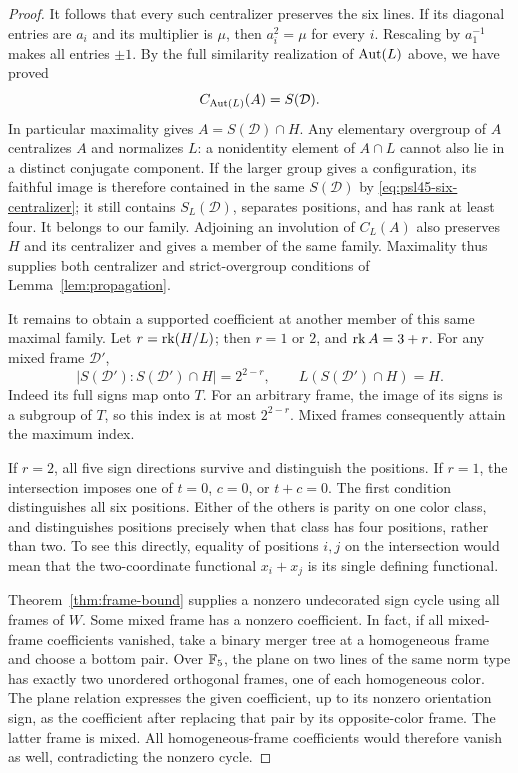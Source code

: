 \begin{proof}
It follows that every such centralizer preserves the six lines.
If its diagonal entries are $a_i$ and its multiplier is $\mu$,
then $a_i^2=\mu$ for every $i$. Rescaling by $a_1^{-1}$ makes
all entries $\pm1$. By the full similarity realization of
$\operatorname{Aut}(L)$ above, we have proved
\begin{equation}\label{eq:psl45-six-centralizer}
 C_{\operatorname{Aut}(L)}(A)=S(\mathcal D).
\end{equation}
In particular maximality gives $A=S(\mathcal D)\cap H$.
Any elementary overgroup of $A$ centralizes $A$ and normalizes $L$:
a nonidentity element of $A\cap L$ cannot also lie in a distinct
conjugate component. If the larger group gives a configuration,
its faithful image is therefore contained in the same
$S(\mathcal D)$ by \eqref{eq:psl45-six-centralizer}; it still
contains $S_L(\mathcal D)$, separates positions, and has rank at
least four. It belongs to our family. Adjoining an involution of
$C_L(A)$ also preserves $H$ and its centralizer and gives a
member of the same family. Maximality thus supplies both
centralizer and strict-overgroup conditions of
Lemma~\ref{lem:propagation}.

It remains to obtain a supported coefficient at another member
of this same maximal family. Let $r=\operatorname{rk}(H/L)$; then $r=1$ or $2$,
and $\operatorname{rk} A=3+r$. For any mixed frame $\mathcal D'$,
\[
 |S(\mathcal D'):S(\mathcal D')\cap H|=2^{2-r},
 \qquad L(S(\mathcal D')\cap H)=H.
\]
Indeed its full signs map onto $T$. For an arbitrary frame, the
image of its signs is a subgroup of $T$, so this index is at most
$2^{2-r}$. Mixed frames consequently attain the maximum index.

If $r=2$, all five sign directions survive and distinguish the
positions. If $r=1$, the intersection imposes one of
$t=0$, $c=0$, or $t+c=0$. The first condition distinguishes all
six positions. Either of the others is parity on one color class,
and distinguishes positions precisely when that class has four
positions, rather than two. To see this directly, equality of
positions $i,j$ on the intersection would mean that the
two-coordinate functional $x_i+x_j$ is its single defining
functional.

Theorem~\ref{thm:frame-bound} supplies a nonzero undecorated sign
cycle using all frames of $W$. Some mixed frame has a nonzero
coefficient. In fact, if all mixed-frame coefficients vanished,
take a binary merger tree at a homogeneous frame and choose a
bottom pair. Over $\mathbb F_5$, the plane on two lines of the same norm
type has exactly two unordered orthogonal frames, one of each
homogeneous color. The plane relation expresses the given
coefficient, up to its nonzero orientation sign, as the coefficient
after replacing that pair by its opposite-color frame. The latter
frame is mixed. All homogeneous-frame coefficients would
therefore vanish as well, contradicting the nonzero cycle.


\end{proof}
